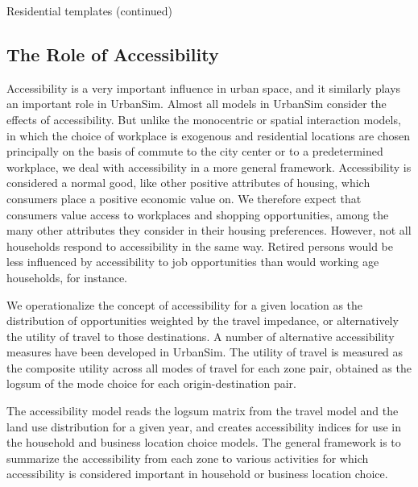 \begin{landscape}
\begin{table}[ht]
\begin{center}
  \caption{Residential templates (continued)}

\end{center}
\end{table}
\end{landscape}


\subsection{The Role of Accessibility}

Accessibility is a very important influence in urban space, and it
similarly plays an important role in UrbanSim.  Almost all models
in UrbanSim consider the effects of accessibility.  But unlike
the monocentric or spatial interaction models, in which the choice
of workplace is exogenous and
residential locations are chosen principally on the basis of
commute to the city center or to a predetermined workplace, we
deal with accessibility in a more general framework. Accessibility
is considered a normal good, like other positive attributes of
housing, which consumers place a positive economic value on.  We
therefore expect that consumers value access to workplaces and
shopping opportunities, among the many other attributes they
consider in their housing preferences. However, not all households
respond to accessibility in the same way. Retired persons would be
less influenced by accessibility to job opportunities than would
working age households, for instance.

We operationalize the concept of accessibility for a given
location as the distribution of opportunities weighted by the
travel impedance, or alternatively the utility of travel to those
destinations.  A number of alternative accessibility measures have
been developed in UrbanSim. The utility of travel is measured as the composite
utility across all modes of travel for each zone pair, obtained as
the logsum of the mode choice for each origin-destination pair.

The accessibility model reads the logsum matrix from the travel
model and the land use distribution for a given year, and creates
accessibility indices for use in the household and business
location choice models. The general framework is to summarize the
accessibility from each zone to various activities for which
accessibility is considered important in household or business
location choice.

